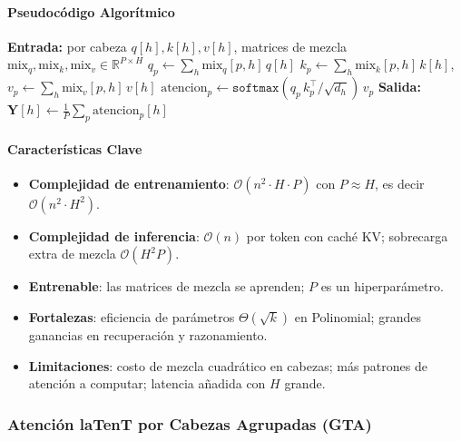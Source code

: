 \paragraph{Pseudocódigo Algorítmico}
\begin{algorithmic}[1]
\State \textbf{Entrada:} por cabeza $q[h], k[h], v[h]$, matrices de mezcla $\text{mix}_q, \text{mix}_k, \text{mix}_v \in \mathbb{R}^{P \times H}$
    \State $q_p \gets \sum_h \text{mix}_q[p,h]\, q[h]$ 
    \State $k_p \gets \sum_h \text{mix}_k[p,h]\, k[h]$, \quad $v_p \gets \sum_h \text{mix}_v[p,h]\, v[h]$
    \State $\text{atencion}_p \gets \texttt{softmax}(q_p\, k_p^\top / \sqrt{d_h})\, v_p$
\EndFor
\State \textbf{Salida:} $\mathbf{Y}[h] \gets \frac{1}{P} \sum_p \text{atencion}_p[h]$ 
\end{algorithmic}

\paragraph{Características Clave}
\begin{itemize}[leftmargin=*]
    \item \textbf{Complejidad de entrenamiento}: $\mathcal{O}(n^2 \cdot H \cdot P)$ con $P \approx H$, es decir $\mathcal{O}(n^2 \cdot H^2)$.
    \item \textbf{Complejidad de inferencia}: $\mathcal{O}(n)$ por token con caché KV; sobrecarga extra de mezcla $\mathcal{O}(H^2 P)$.
    \item \textbf{Entrenable}: las matrices de mezcla se aprenden; $P$ es un hiperparámetro.
    \item \textbf{Fortalezas}: eficiencia de parámetros $\Theta(\sqrt{k})$ en Polinomial; grandes ganancias en recuperación y razonamiento.
    \item \textbf{Limitaciones}: costo de mezcla cuadrático en cabezas; más patrones de atención a computar; latencia añadida con $H$ grande.
\end{itemize}

\subsubsection{Atención laTenT por Cabezas Agrupadas (GTA)}

